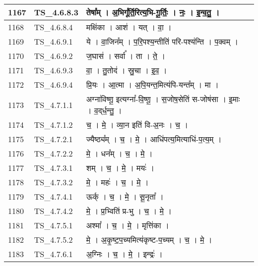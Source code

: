 \documentclass[17pt]{extarticle}
\begin{document}
\begin{longtable}{||p{0.4in}||p{0.9in}||p{4.0in}||p{0.9in}||}
        \hline
            1167 & TS\_4.6.8.3 & तेषा᳚म्   ।   अ॒भिगू᳚र्ति॒रित्य॒भि{-}गू॒र्तिः॒   ।   नः॒   ।   इ॒न्व॒तु॒   ।    &      \\
        \hline
            1168 & TS\_4.6.8.4 & मक्षि॑का   ।   आश॑   ।   यत्   ।   वा॒   ।    &      \\
        \hline
            1169 & TS\_4.6.9.1 & ये   ।   वा॒जिन᳚म्   ।   प॒रि॒पश्य॒न्तीति॑ परि{-}पश्य॑न्ति   ।   प॒क्वम्   ।    &      \\
        \hline
            1170 & TS\_4.6.9.2 & ज॒घास॑   ।   सर्वा᳚   ।   ता   ।   ते॒   ।    &      \\
        \hline
            1171 & TS\_4.6.9.3 & वा॒   ।   तु॒तोद॑   ।   स्रु॒चा   ।   इ॒व॒   ।    &      \\
        \hline
            1172 & TS\_4.6.9.4 & प्रि॒यः   ।   आ॒त्मा   ।   अ॒पि॒यन्त॒मित्य॑पि{-}यन्त᳚म्   ।   मा   ।    &      \\
        \hline
            1173 & TS\_4.7.1.1 & अग्ना॑विष्णू॒ इत्यग्ना᳚{-}वि॒ष्णू॒   ।   स॒जोष॒सेति॑ स{-}जोष॑सा   ।   इ॒माः   ।   व॒द्‌र्ध॒न्तु॒   ।    &      \\
        \hline
            1174 & TS\_4.7.1.2 & च॒   ।   मे॒   ।   व्या॒न इति॑ वि{-}अ॒नः   ।   च॒   ।    &      \\
        \hline
            1175 & TS\_4.7.2.1 & ज्यैष्ठ्य᳚म्   ।   च॒   ।   मे॒   ।   आधि॑पत्य॒मित्याधि॑{-}प॒त्य॒म्   ।    &      \\
        \hline
            1176 & TS\_4.7.2.2 & मे॒   ।   धन᳚म्   ।   च॒   ।   मे॒   ।    &      \\
        \hline
            1177 & TS\_4.7.3.1 & शम्   ।   च॒   ।   मे॒   ।   मयः॑   ।    &      \\
        \hline
            1178 & TS\_4.7.3.2 & मे॒   ।   महः॑   ।   च॒   ।   मे॒   ।    &      \\
        \hline
            1179 & TS\_4.7.4.1 & ऊर्क्   ।   च॒   ।   मे॒   ।   सू॒नृता᳚   ।    &      \\
        \hline
            1180 & TS\_4.7.4.2 & मे॒   ।   प्र॒भ्विति॑ प्र{-}भु   ।   च॒   ।   मे॒   ।    &      \\
        \hline
            1181 & TS\_4.7.5.1 & अश्मा᳚   ।   च॒   ।   मे॒   ।   मृत्ति॑का   ।    &      \\
        \hline
            1182 & TS\_4.7.5.2 & मे॒   ।   अ॒कृ॒ष्ट॒प॒च्यमित्य॑कृष्ट{-}प॒च्यम्   ।   च॒   ।   मे॒   ।    &      \\
        \hline
            1183 & TS\_4.7.6.1 & अ॒ग्निः   ।   च॒   ।   मे॒   ।   इन्द्रः॑   ।    &      \\

\end{longtable}
\end{document}
